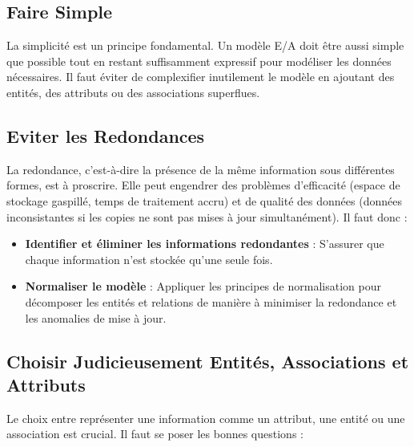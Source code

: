 \documentclass{article}
\begin{document}
\subsection{Faire Simple}

La simplicité est un principe fondamental. Un modèle E/A doit être aussi simple que possible tout en restant suffisamment expressif pour modéliser les données nécessaires.  Il faut éviter de complexifier inutilement le modèle en ajoutant des entités, des attributs ou des associations superflues.

\subsection{Eviter les Redondances}

La redondance, c'est-à-dire la présence de la même information sous différentes formes, est à proscrire.  Elle peut engendrer des problèmes d'efficacité (espace de stockage gaspillé, temps de traitement accru) et de qualité des données (données inconsistantes si les copies ne sont pas mises à jour simultanément).  Il faut donc :

\begin{itemize}
    \item \textbf{Identifier et éliminer les informations redondantes} :  S'assurer que chaque information n'est stockée qu'une seule fois.
    \item \textbf{Normaliser le modèle} :  Appliquer les principes de normalisation pour décomposer les entités et relations de manière à minimiser la redondance et les anomalies de mise à jour.
\end{itemize}

\subsection{Choisir Judicieusement Entités, Associations et Attributs}

Le choix entre représenter une information comme un attribut, une entité ou une association est crucial. Il faut se poser les bonnes questions :
\end{document}
